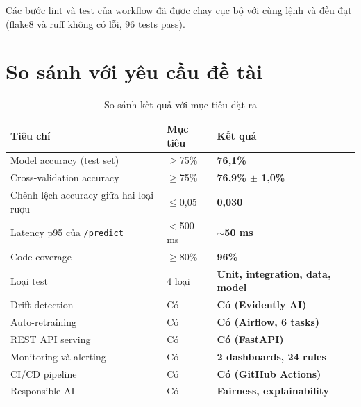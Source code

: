 \documentclass[12pt,a4paper]{report}
\begin{document}
Các bước lint và test của workflow đã được chạy cục bộ với cùng lệnh và đều đạt (flake8 và ruff không có lỗi, 96 tests pass).

\section{So sánh với yêu cầu đề tài}

\begin{table}[H]
  \centering
  \caption{So sánh kết quả với mục tiêu đặt ra}
  \label{tab:comparison}
  \begin{tabularx}{\textwidth}{Xll}
    \toprule
    \textbf{Tiêu chí} & \textbf{Mục tiêu} & \textbf{Kết quả} \\
    \midrule
    Model accuracy (test set)          & $\geq$75\%    & \textcolor{green!60!black}{\textbf{76,1\%}} \\
    Cross-validation accuracy          & $\geq$75\%    & \textcolor{green!60!black}{\textbf{76,9\% $\pm$ 1,0\%}} \\
    Chênh lệch accuracy giữa hai loại rượu & $\leq$0,05 & \textcolor{green!60!black}{\textbf{0,030}} \\
    Latency p95 của \texttt{/predict}  & $<$500 ms     & \textcolor{green!60!black}{\textbf{$\sim$50 ms}} \\
    Code coverage                      & $\geq$80\%    & \textcolor{green!60!black}{\textbf{96\%}} \\
    Loại test                          & 4 loại        & \textcolor{green!60!black}{\textbf{Unit, integration, data, model}} \\
    Drift detection                    & Có            & \textcolor{green!60!black}{\textbf{Có (Evidently AI)}} \\
    Auto-retraining                    & Có            & \textcolor{green!60!black}{\textbf{Có (Airflow, 6 tasks)}} \\
    REST API serving                   & Có            & \textcolor{green!60!black}{\textbf{Có (FastAPI)}} \\
    Monitoring và alerting             & Có            & \textcolor{green!60!black}{\textbf{2 dashboards, 24 rules}} \\
    CI/CD pipeline                     & Có            & \textcolor{green!60!black}{\textbf{Có (GitHub Actions)}} \\
    Responsible AI                     & Có            & \textcolor{green!60!black}{\textbf{Fairness, explainability}} \\
    \bottomrule
  \end{tabularx}
\end{table}
\end{document}
